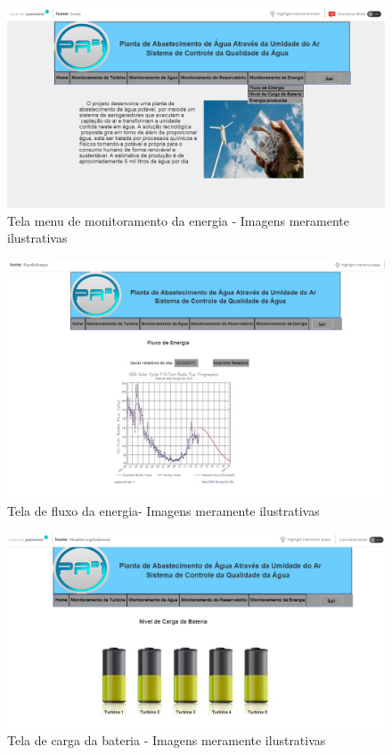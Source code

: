 \begin{center}
\begin{figure}[!ht]
\centering
\includegraphics[scale=0.5]{figuras/menu_monitoramento_da_energia}
\caption[Tela menu de monitoramento da energia]{Tela menu de monitoramento da energia - Imagens meramente ilustrativas}
\label{menu_monitoramento_da_energia}
\end{figure}
\clearpage

\begin{figure}[!ht]
\centering
\includegraphics[scale=0.5]{figuras/14}
\caption[Tela de fluxo da energia]{Tela de fluxo da energia- Imagens meramente ilustrativas}
\label{tela_fluxo_energia}
\end{figure}
\clearpage

\begin{figure}[!ht]
\centering
\includegraphics[scale=0.5]{figuras/15}
\caption[Tela de carga da bateria]{Tela de carga da bateria - Imagens meramente ilustrativas}
\label{tela_carga_bateria}
\end{figure}
\clearpage


\end{center}
